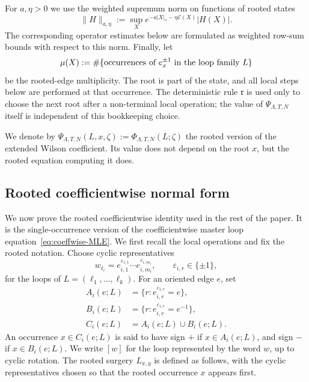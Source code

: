 \documentclass[11pt,a4paper,reqno]{amsart}
\theoremstyle{definition}
\theoremstyle{remark}
\begin{document}
For $a,\eta>0$ we use the weighted supremum norm on functions of rooted states
\begin{equation}\label{eq:raw-weighted-norm}
\|H\|_{a,\eta}:=
\sup_X e^{-a|X|_* -\eta \mathcal E(X)}|H(X)|.
\end{equation}
The corresponding operator estimates below are formulated as weighted row-sum bounds with respect to this norm.
Finally, let
\[
\mu(X):=\#\{\hbox{occurrences of } e_x^{\pm1}\hbox{ in the loop family }L\}
\]
be the rooted-edge multiplicity.  The root is part of the state, and all local steps below are performed at that occurrence. The deterministic rule $\mathfrak r$ is used only to choose the next root after a non-terminal local operation; the value of $\Psi_{\Lambda,T,N}$ itself is independent of this bookkeeping choice.

We denote by $\Psi_{\Lambda,T,N}(L,x,\zeta):=\Phi_{\Lambda,T,N}(L;\zeta)$ the rooted version of the extended Wilson coefficient. Its value does not depend on the root $x$, but the rooted equation computing it does.

\subsection{Rooted coefficientwise normal form}\label{subsec:normalform}

We now prove the rooted coefficientwise identity used in the rest of the paper. It is the single-occurrence version of the coefficientwise master loop equation~\eqref{eq:coeffwise-MLE}. We first recall the local operations and fix the rooted notation.  Choose cyclic representatives
\[
w_{\ell_i}=e_{i,1}^{\varepsilon_{i,1}}\cdots e_{i,m_i}^{\varepsilon_{i,m_i}},
\qquad \varepsilon_{i,r}\in\{\pm1\},
\]
for the loops of $L=(\ell_1,\ldots,\ell_k)$.  For an oriented edge $e$, set
\[
\begin{aligned}
A_i(e;L)&=\{r:e_{i,r}^{\varepsilon_{i,r}}=e\},\\
B_i(e;L)&=\{r:e_{i,r}^{\varepsilon_{i,r}}=e^{-1}\},\\
C_i(e;L)&=A_i(e;L)\cup B_i(e;L).
\end{aligned}
\]
An occurrence $x\in C_i(e;L)$ is said to have sign $+$ if $x\in A_i(e;L)$, and sign $-$ if $x\in B_i(e;L)$.  We write $[w]$ for the loop represented by the word $w$, up to cyclic rotation.  The rooted surgery $L_{x,y}$ is defined as follows, with the cyclic representatives chosen so that the rooted occurrence $x$ appears first.
\end{document}
